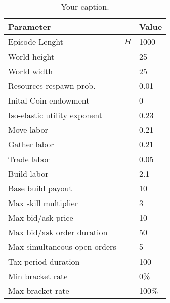 


\begin{table}[]
    \centering
    \begin{tabular}{lll}
    \hline
    Parameter                    &  & Value \\ \hline
    Episode Lenght               & \( H \) & 1000  \\
    World height                 &  & 25    \\
    World width                  &  & 25    \\
    Resources respawn prob.      &  & 0.01  \\
    Inital Coin endowment        &  & 0     \\
    Iso-elastic utility exponent &  & 0.23  \\
    Move labor                   &  & 0.21  \\
    Gather labor                 &  & 0.21  \\
    Trade labor                  &  & 0.05  \\
    Build labor                  &  & 2.1   \\
    Base build payout            &  & 10    \\
    Max skill multiplier         &  & 3     \\
    Max bid/ask price            &  & 10    \\
    Max bid/ask order duration   &  & 50    \\
    Max simultaneous open orders &  & 5     \\
    Tax period duration          &  & 100   \\
    Min bracket rate             &  & 0\%   \\
    Max bracket rate             &  & 100\% \\ \hline
    \end{tabular}
    \caption{\label{tab:hyperparameter_env}Your caption.}
\end{table}


